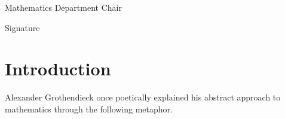 \documentclass[11pt,openany]{book} %
\begin{document}
\vspace{1in}
\begin{minipage}{0.5\textwidth}
\underline{\hspace{2.5in}}

\noindent Mathematics Department Chair
\end{minipage}
\begin{minipage}{0.5\textwidth}
\underline{\hspace{2.5in}}

\noindent Signature
\end{minipage}


%
%
\tableofcontents %
%
%


\chapter{Introduction}

Alexander Grothendieck once poetically explained his abstract approach to mathematics through the following metaphor.\\
\end{document}
